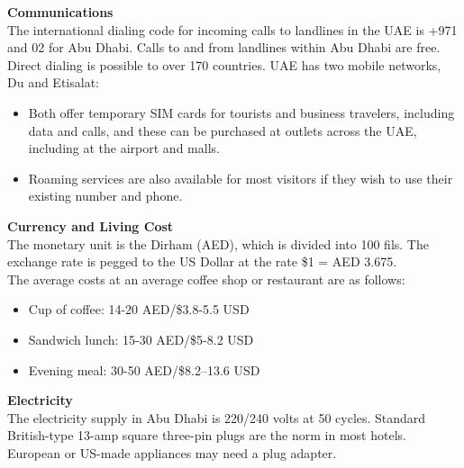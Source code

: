 {\large \textbf{Communications}}\\
The international dialing code for incoming calls to landlines in the UAE is +971 and 02 for Abu Dhabi. 
Calls to and from landlines within Abu Dhabi are free. Direct dialing is possible to over 170 countries. 
UAE has two mobile networks, Du and Etisalat:
\begin{itemize}
    \item Both offer temporary SIM cards for tourists and business travelers, including data and calls, and these can be purchased at outlets across the UAE, including at the airport and malls.
    \item Roaming services are also available for most visitors if they wish to use their existing number and phone.
\end{itemize}

{\large \textbf{Currency and Living Cost}}\\
The monetary unit is the Dirham (AED), which is divided into 100 fils. The exchange rate is pegged to the US Dollar at the rate \$1 = AED 3.675.\\
The average costs at an average coffee shop or restaurant are as follows:
\begin{itemize}
    \item Cup of coffee: 14-20 AED/\$3.8-5.5 USD
    \item Sandwich lunch: 15-30 AED/\$5-8.2 USD
    \item Evening meal: 30-50 AED/\$8.2–13.6 USD
\end{itemize}

{\large \textbf{Electricity}}\\
The electricity supply in Abu Dhabi is 220/240 volts at 50 cycles.
Standard British-type 13-amp square three-pin plugs are the norm in most hotels. 
European or US-made appliances may need a plug adapter.\\


